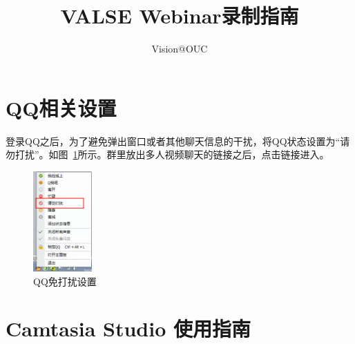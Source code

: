 \documentclass[12pt]{ctexart}
\begin{document}
\title{VALSE Webinar录制指南}
\author{Vision@OUC}
\maketitle\thispagestyle{fancy}
\maketitle
\section{QQ相关设置}
登录QQ之后，为了避免弹出窗口或者其他聊天信息的干扰，将QQ状态设置为“请勿打扰”。如图~\ref{qq}所示。群里放出多人视频聊天的链接之后，点击链接进入。
\begin{figure}[!ht]
\centering
\includegraphics[width=0.2\textwidth]{QQset.png}
\caption{QQ免打扰设置}
\label{qq}
\end{figure}


\section{Camtasia Studio 使用指南}
\end{document}

